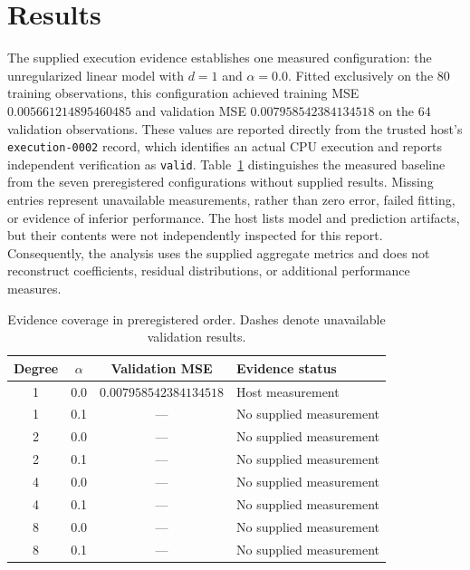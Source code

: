 \documentclass[11pt]{article}
\begin{document}
\section{Results}
The supplied execution evidence establishes one measured configuration: the unregularized linear model with \(d=1\) and \(\alpha=0.0\). Fitted exclusively on the \(80\) training observations, this configuration achieved training MSE \(0.005661214895460485\) and validation MSE \(0.007958542384134518\) on the \(64\) validation observations. These values are reported directly from the trusted host's \texttt{execution-0002} record, which identifies an actual CPU execution and reports independent verification as \texttt{valid}. Table~\ref{tab:results-coverage} distinguishes the measured baseline from the seven preregistered configurations without supplied results. Missing entries represent unavailable measurements, rather than zero error, failed fitting, or evidence of inferior performance. The host lists model and prediction artifacts, but their contents were not independently inspected for this report. Consequently, the analysis uses the supplied aggregate metrics and does not reconstruct coefficients, residual distributions, or additional performance measures.
\begin{table}[ht]
\centering
\begin{tabular}{cccl}
\hline
Degree & \(\alpha\) & Validation MSE & Evidence status\\
\hline
1 & 0.0 & \(0.007958542384134518\) & Host measurement\\
1 & 0.1 & --- & No supplied measurement\\
2 & 0.0 & --- & No supplied measurement\\
2 & 0.1 & --- & No supplied measurement\\
4 & 0.0 & --- & No supplied measurement\\
4 & 0.1 & --- & No supplied measurement\\
8 & 0.0 & --- & No supplied measurement\\
8 & 0.1 & --- & No supplied measurement\\
\hline
\end{tabular}
\caption{Evidence coverage in preregistered order. Dashes denote unavailable validation results.}
\label{tab:results-coverage}
\end{table}
\end{document}
